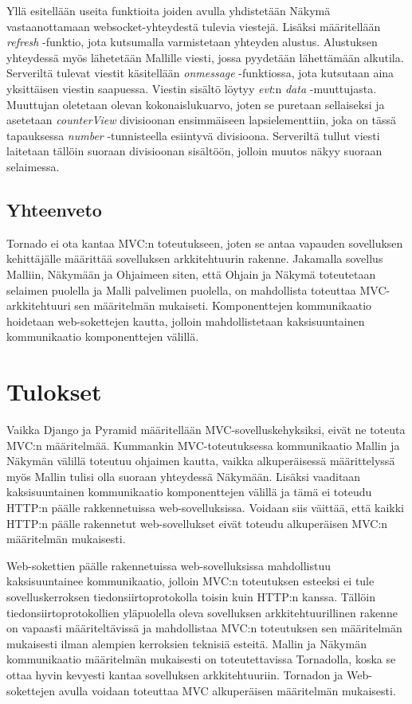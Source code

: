 \documentclass[utf8]{gradu3}
\begin{document}
Yllä esitellään useita funktioita joiden avulla yhdistetään Näkymä vastaanottamaan websocket-yhteydestä tulevia viestejä. Lisäksi määritellään \emph{refresh} -funktio, jota kutsumalla varmistetaan yhteyden alustus. Alustuksen yhteydessä myös lähetetään Mallille viesti, jossa pyydetään lähettämään alkutila. Serveriltä tulevat viestit käsitellään \emph{onmessage} -funktiossa, jota kutsutaan aina yksittäisen viestin saapuessa. Viestin sisältö löytyy \emph{evt}:n \emph{data} -muuttujasta. Muuttujan oletetaan olevan kokonaislukuarvo, joten se puretaan sellaiseksi ja asetetaan \emph{counterView} divisioonan ensimmäiseen lapsielementtiin, joka on tässä tapauksessa \emph{number} -tunnisteella esiintyvä divisioona. Serveriltä tullut viesti laitetaan tällöin suoraan divisioonan sisältöön, jolloin muutos näkyy suoraan selaimessa. 

\section{Yhteenveto}
Tornado ei ota kantaa MVC:n toteutukseen, joten se antaa vapauden sovelluksen kehittäjälle määrittää sovelluksen arkkitehtuurin rakenne. Jakamalla sovellus Malliin, Näkymään ja Ohjaimeen siten, että Ohjain ja Näkymä toteutetaan selaimen puolella ja Malli palvelimen puolella, on mahdollista toteuttaa MVC-arkkitehtuuri sen määritelmän mukaiseti. Komponenttejen kommunikaatio hoidetaan web-sokettejen kautta, jolloin mahdollistetaan kaksisuuntainen kommunikaatio komponenttejen välillä. 

\chapter{Tulokset}
Vaikka Django ja Pyramid määritellään MVC-sovelluskehyksiksi, eivät ne toteuta MVC:n määritelmää. Kummankin MVC-toteutuksessa kommunikaatio Mallin ja Näkymän välillä toteutuu ohjaimen kautta, vaikka alkuperäisessä määrittelyssä myös Mallin tulisi olla suoraan yhteydessä Näkymään. Lisäksi vaaditaan kaksisuuntainen kommunikaatio komponenttejen välillä ja tämä ei toteudu HTTP:n päälle rakkennetuissa web-sovelluksissa. Voidaan siis väittää, että kaikki HTTP:n päälle rakennetut web-sovellukset eivät toteudu alkuperäisen MVC:n määritelmän mukaisesti. 

Web-sokettien päälle rakennetuissa web-sovelluksissa mahdollistuu kaksisuuntainee kommunikaatio, jolloin MVC:n toteutuksen esteeksi ei tule sovelluskerroksen tiedonsiirtoprotokolla toisin kuin HTTP:n kanssa. Tällöin tiedonsiirtoprotokollien yläpuolella oleva sovelluksen arkkitehtuurillinen rakenne on vapaasti määriteltävissä ja mahdollistaa MVC:n toteutuksen sen määritelmän mukaisesti ilman alempien kerroksien teknisiä esteitä. Mallin ja Näkymän kommunikaatio määritelmän mukaisesti on toteutettavissa Tornadolla, koska se ottaa hyvin kevyesti kantaa sovelluksen arkkitehtuuriin. Tornadon ja Web-sokettejen avulla voidaan toteuttaa MVC alkuperäisen määritelmän mukaisesti.

\printbibliography
\end{document}
